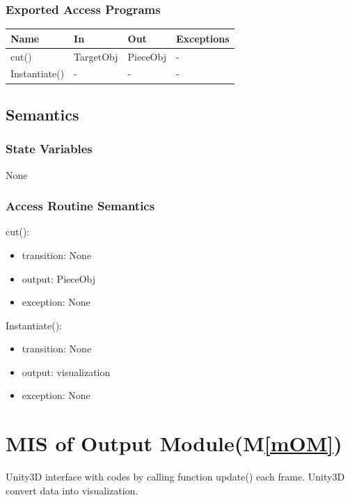 \documentclass[12pt, titlepage]{article}
\newcommand{\mref}[1]{M\ref{#1}}
\begin{document}
\subsubsection{Exported Access Programs}

\begin{center}
	\begin{tabular}{p{2cm} p{4cm} p{4cm} p{2cm}}
		\hline
		\textbf{Name} & \textbf{In} & \textbf{Out} & \textbf{Exceptions} \\
		\hline
		cut() & TargetObj & PieceObj & - \\
		Instantiate() & - & - & - \\
		\hline
	\end{tabular}
\end{center}

\subsection{Semantics}

\subsubsection{State Variables}

None

\subsubsection{Access Routine Semantics}

\noindent cut():
\begin{itemize}
	\item transition: None
	\item output: PieceObj 
	\item exception: None 
\end{itemize}

\noindent Instantiate():
\begin{itemize}
	\item transition: None
	\item output: visualization  
	\item exception: None 
\end{itemize}

\section{MIS of Output Module(\mref{mOM})}

Unity3D interface with codes by calling function update() each frame. Unity3D convert data into visualization.
\end{document}
